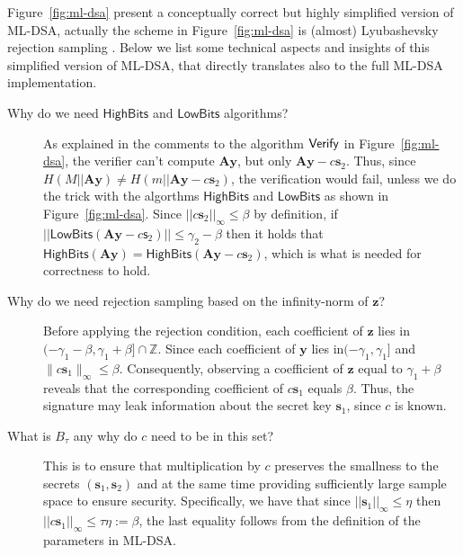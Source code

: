 Figure~\ref{fig:ml-dsa} present a conceptually correct but highly simplified version of ML-DSA, actually the scheme in Figure~\ref{fig:ml-dsa} is (almost) Lyubashevsky rejection sampling \cite{AC:Lyubashevsky09,EC:Lyubashevsky12}. Below we list some technical aspects and insights of this simplified version of ML-DSA, that directly translates also to the full ML-DSA implementation.
\begin{description}
\item[Why do we need \(\mathsf{HighBits}\) and \(\mathsf{LowBits}\) algorithms?]

        As explained in the comments to the algorithm \(\mathsf{Verify}\) in Figure~\ref{fig:ml-dsa}, the verifier can't compute \(\mathbf{Ay}\), but only \(\mathbf{Ay}-c\mathbf{s}_2\). Thus, since \(H(M|| \mathbf{Ay}) \neq H(m||\mathbf{Ay}-c\mathbf{s}_2)\), the verification would fail, unless we do the trick with the algorthms \(\mathsf{HighBits}\) and \(\mathsf{LowBits}\) as shown in Figure~\ref{fig:ml-dsa}. 
        Since \(||c\mathbf{s}_2||_\infty\leq \beta\) by definition, if \(||\mathsf{LowBits}(\mathbf{Ay}-c\mathsf{s}_2)||\leq \gamma_2-\beta\) then it holds that \(\mathsf{HighBits}(\mathbf{Ay}) = \mathsf{HighBits}(\mathbf{Ay}-c\mathbf{s}_2)\), which is what is needed for correctness to hold.
    
\item[Why do we need rejection sampling based on the infinity-norm of \(\mathbf{z}\)?]

     Before applying the rejection condition, each coefficient of
    $\mathbf{z}$ lies in \( (-\gamma_1-\beta,\gamma_1+\beta]\cap\mathbb{Z}. \)
    Since each coefficient of $\mathbf{y}$ lies in$(-\gamma_1,\gamma_1]$ and $\|c\mathbf{s}_1\|_\infty \leq \beta$.
    Consequently, observing a coefficient of  $\mathbf{z}$ equal to $\gamma_1+\beta$ reveals that the corresponding coefficient of $c\mathbf{s}_1$ equals $\beta$.
    Thus, the signature may leak information about the secret key $\mathbf{s}_1$, since \(c\) is known.

    \item[What is \(B_\tau\) any why do \(c\) need to be in this set?] This is to ensure that multiplication by \(c\) preserves the smallness to the secrets \((\mathbf{s}_1,\mathbf{s}_2)\) and at the same time providing sufficiently large sample space to ensure security. Specifically, we have that since \(||\mathbf{s}_1||_\infty\leq \eta \) then \(||c \mathbf{s}_1||_\infty\leq \tau \eta := \beta \), the last equality follows from the definition of the parameters in ML-DSA\cite{NISTPQC-R3:CRYSTALS-DILITHIUM20}.
\end{description}



